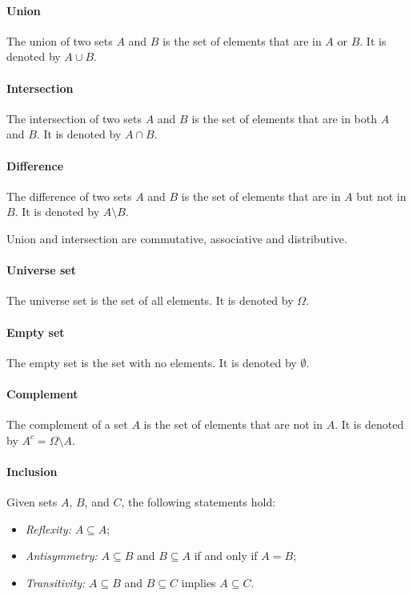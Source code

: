 \paragraph{Union}  The union of two sets $A$ and $B$ is the set of elements that are in
$A$ or $B$.  It is denoted by $A \cup B$.

\paragraph{Intersection}  The intersection of two sets $A$ and $B$ is the set of elements
that are in both $A$ and $B$.  It is denoted by $A \cap B$.

\paragraph{Difference}  The difference of two sets $A$ and $B$ is the set of elements
that are in $A$ but not in $B$.  It is denoted by $A \setminus B$.

Union and intersection are commutative, associative and distributive.

\paragraph{Universe set}  The universe set is the set of all elements.  It is denoted
by $\Omega$.

\paragraph{Empty set}  The empty set is the set with no elements.  It is denoted by
$\emptyset$.

\paragraph{Complement}  The complement of a set $A$ is the set of elements that are not
in $A$.  It is denoted by $A^c = \Omega \setminus A$.

\paragraph{Inclusion}  Given sets $A$, $B$, and $C$, the following statements hold:
\begin{itemize}
  \item \emph{Reflexity:} $A \subseteq A$;
  \item \emph{Antisymmetry:} $A \subseteq B$ and $B \subseteq A$ if and only if $A = B$;
  \item \emph{Transitivity:} $A \subseteq B$ and $B \subseteq C$ implies $A \subseteq C$.
\end{itemize}

